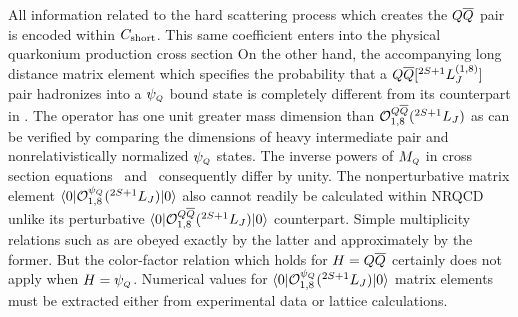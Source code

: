 	All information related to the hard scattering process which creates 
the $Q{\overline Q}$ pair is encoded within $C_{\rm short}$.  This same coefficient enters 
into the physical quarkonium production cross section
%
\eqn{}
%
On the other hand, the accompanying long distance matrix element which 
specifies the probability that a $Q{\overline Q}[ ^{2S+1}L_J^{(1,8)}]$ pair hadronizes into a 
$\psi_{\scriptscriptstyle Q}$ bound state is completely different from its counterpart in \matchI.  
The operator 
%
\eqn{} 
%
has one unit greater mass dimension than ${\cal O}_{1,8}^{Q{\overline Q}}(^{2S+1}L_J)$ as 
can be verified by comparing the dimensions of heavy intermediate pair and 
nonrelativistically normalized $\psi_{\scriptscriptstyle Q}$ states.  The inverse powers of $M_{\scriptscriptstyle Q}$ in 
cross section equations \matchI\ and \matchII\ consequently differ by unity.  
The nonperturbative matrix element
$\langle 0 | {\cal O}_{1,8}^{\psi_{\scriptscriptstyle Q}}(^{2S+1}L_J) | 0 \rangle$ also cannot 
readily be calculated within NRQCD unlike its perturbative
$\langle 0 | {\cal O}_{1,8}^{{Q{\overline Q}}}(^{2S+1}L_J) | 0 \rangle$ counterpart.  Simple
multiplicity relations such as 
%
\eqn{}
%
are obeyed exactly by the latter and approximately by the former.  But the 
color-factor relation 
%
\eqn{}
%
which holds for $H={Q{\overline Q}}$ certainly does not apply when $H=\psi_{\scriptscriptstyle Q}$. 
Numerical values for $\langle 0 | {\cal O}_{1,8}^{\psi_{\scriptscriptstyle Q}}(^{2S+1}L_J) | 0 \rangle$ 
matrix elements must be extracted either from experimental data or 
lattice calculations.

